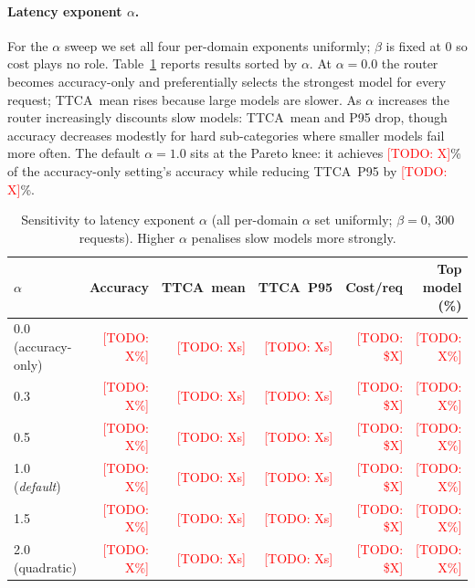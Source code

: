 \documentclass[11pt]{article}
\newcommand{\ttca}{\textsc{TTCA}\xspace}
\newcommand{\todo}[1]{\textcolor{red}{[TODO: #1]}}
\begin{document}
\paragraph{Latency exponent $\alpha$.}
For the $\alpha$ sweep we set all four per-domain exponents uniformly;
$\beta$ is fixed at $0$ so cost plays no role.
Table~\ref{tab:alpha_sweep} reports results sorted by $\alpha$.
At $\alpha{=}0.0$ the router becomes accuracy-only and preferentially
selects the strongest model for every request; \ttca\ mean rises because
large models are slower.
As $\alpha$ increases the router increasingly discounts slow models:
\ttca\ mean and P95 drop, though accuracy decreases modestly for hard
sub-categories where smaller models fail more often.
The default $\alpha{=}1.0$ sits at the Pareto knee: it achieves
\todo{X}\% of the accuracy-only setting's accuracy while reducing
\ttca\ P95 by \todo{X}\%.

\begin{table}[t]
  \centering
  \caption{Sensitivity to latency exponent $\alpha$
           (all per-domain $\alpha$ set uniformly; $\beta{=}0$, 300 requests).
           Higher $\alpha$ penalises slow models more strongly.}
  \label{tab:alpha_sweep}
  \small
  \begin{tabular}{lrrrrr}
    \toprule
    $\alpha$ & Accuracy & \ttca\ mean & \ttca\ P95 & Cost/req & Top model (\%) \\
    \midrule
    0.0 (accuracy-only) & \todo{X\%} & \todo{Xs} & \todo{Xs} & \todo{\$X} & \todo{X\%} \\
    0.3                 & \todo{X\%} & \todo{Xs} & \todo{Xs} & \todo{\$X} & \todo{X\%} \\
    0.5                 & \todo{X\%} & \todo{Xs} & \todo{Xs} & \todo{\$X} & \todo{X\%} \\
    1.0 (\emph{default})& \todo{X\%} & \todo{Xs} & \todo{Xs} & \todo{\$X} & \todo{X\%} \\
    1.5                 & \todo{X\%} & \todo{Xs} & \todo{Xs} & \todo{\$X} & \todo{X\%} \\
    2.0 (quadratic)     & \todo{X\%} & \todo{Xs} & \todo{Xs} & \todo{\$X} & \todo{X\%} \\
    \bottomrule
  \end{tabular}
\end{table}
\end{document}
